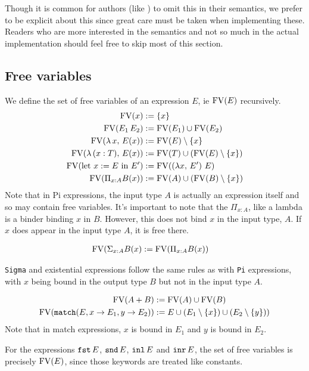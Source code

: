 \documentclass{article}
\begin{document}
Though it is common for authors (like \cite{lambdapi}) to omit this in their
semantics, we prefer to be explicit about this since great care must be taken
when implementing these.
Readers who are more interested in the semantics and not so much in the actual
implementation should feel free to skip most of this section.

\subsection{Free variables}
We define the set of free variables of an expression $E$, ie $\operatorname{FV}(E)$ recursively.
\begin{align*}
  \operatorname{FV} (x) &:= \{x\} \\
  \operatorname{FV} (E_1 \, E_2) &:= \operatorname{FV}(E_1) \cup \operatorname{FV}(E_2) \\
  \operatorname{FV} (\lambda \, x, \, E(x)) &:= \operatorname{FV}(E) \setminus \{x\} \\
  \operatorname{FV} (\lambda \, (x : T), \, E(x)) &:= \operatorname{FV}(T) \cup (\operatorname{FV}(E) \setminus \{x\}) \\
  \operatorname{FV} (\text{let } x := E \text{ in } E') &:= \operatorname{FV}((\lambda x, \, E') \,\, E) \\
  \operatorname{FV} (\Pi_{x : A} B(x)) &:= \operatorname{FV}(A) \cup (\operatorname{FV}(B) \setminus \{x\})
\end{align*}
Note that in Pi expressions, the input type $A$ is actually an expression itself
and so may contain free variables. It's important to note that the $\Pi_{x :
  A}$, like a lambda is a binder binding $x$ in $B$. However, this does not bind
$x$ in the input type, $A$. If $x$ does appear in the input type $A$, it is
free there.

\begin{align*}
 \operatorname{FV} (\Sigma_{x : A} B(x) &:= \operatorname{FV}(\Pi_{x : A} B(x))
\end{align*}

\verb|Sigma| and existential expressions follow the same rules as with \verb|Pi|
expressions, with $x$ being bound in the output type $B$ but not in the input type $A$.

\begin{align*}
  \operatorname{FV} (A + B) &:= \operatorname{FV}(A) \cup \operatorname{FV}(B) \\
  \operatorname{FV} (\texttt{match}(E, x \rightarrow E_1, y \rightarrow E_2)) &:= 
    E \cup (E_1 \setminus \{x\}) \cup (E_2 \setminus \{y\}))
\end{align*}
Note that in match expressions, $x$ is bound in $E_1$ and $y$ is bound in $E_2$.

For the expressions $\texttt{fst} \, E$, $\texttt{snd} \, E$, $\texttt{inl} \, E$ and $\texttt{inr} \, E$, the
set of free variables is precisely $\operatorname{FV}(E)$, since those keywords are treated
like constants.
\end{document}
